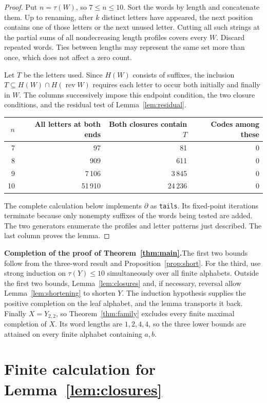 \documentclass[11pt,a4paper]{article}
\newcommand{\head}[1]{\par\noindent\textbf{#1}\enspace}
\DeclareMathOperator{\rev}{rev}
\begin{document}
\begin{proof}
Put $n=\tau(W)$, so $7\le n\le10$. Sort the words by length and concatenate them. Up to renaming,
after $k$ distinct letters have appeared, the next position contains one of those letters or the
next unused letter. Cutting all such strings at the partial sums of all nondecreasing length
profiles covers every $W$. Discard repeated words. Ties between lengths may represent the same set
more than once, which does not affect a zero count.

Let $T$ be the letters used. Since $H(W)$ consists of suffixes, the inclusion
$T\subseteq H(W)\cap H(\rev W)$ requires each letter to occur both initially and finally in $W$.
The columns successively impose this endpoint condition, the two closure conditions, and the
residual test of Lemma~\ref{lem:residual}.
\begin{center}
\begin{tabular}{rrrr}
$n$ & All letters at both ends & Both closures contain $T$ & Codes among these\\\hline
7 & 97 & 81 & 0\\
8 & 909 & 611 & 0\\
9 & 7\,106 & 3\,845 & 0\\
10 & 51\,910 & 24\,236 & 0
\end{tabular}
\end{center}
The complete calculation below implements $\partial$ as \texttt{tails}. Its fixed-point iterations
terminate because only nonempty suffixes of the words being tested are added. The two generators
enumerate the profiles and letter patterns just described. The last column proves the lemma.
\end{proof}

\head{Completion of the proof of Theorem~\ref{thm:main}.}The first two bounds follow from the
three-word result and Proposition~\ref{prop:short}. For the third, use strong induction on
$\tau(Y)\le10$ simultaneously over all finite alphabets. Outside the first two bounds,
Lemma~\ref{lem:closures} and, if necessary, reversal allow Lemma~\ref{lem:shortening} to shorten
$Y$. The induction hypothesis supplies the positive completion on the leaf alphabet, and the lemma
transports it back. Finally $X=Y_{2,2}$, so Theorem~\ref{thm:family} excludes every finite maximal
completion of $X$. Its word lengths are $1,2,4,4$, so the three lower bounds are attained on
every finite alphabet containing $a,b$.

\section*{Finite calculation for Lemma~\ref{lem:closures}}
\end{document}
